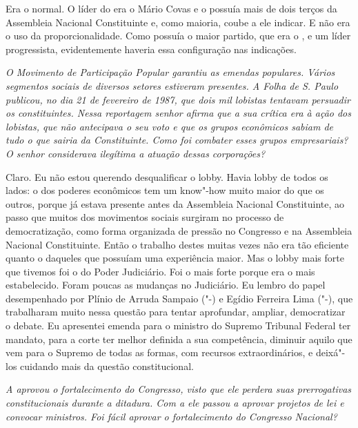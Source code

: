 Era o normal. O líder do  era o Mário Covas e o
 possuía mais de dois terços da Assembleia Nacional Constituinte e,
como maioria, coube a ele indicar. E não era o uso da proporcionalidade.
Como possuía o maior partido, que era o , e um líder progressista,
evidentemente haveria essa configuração nas indicações.

\medskip

\emph{O Movimento de Participação Popular garantiu as emendas
populares. Vários segmentos sociais de diversos setores estiveram
presentes. A Folha de S. Paulo publicou, no dia 21 de fevereiro de 1987,
que dois mil lobistas tentavam persuadir os constituintes. Nessa
reportagem senhor afirma que a sua crítica era à ação dos lobistas, que
não antecipava o seu voto e que os grupos econômicos sabiam de tudo o
que sairia da Constituinte. Como foi combater esses grupos empresariais?
O senhor considerava ilegítima a atuação dessas corporações?}

Claro. Eu não estou querendo desqualificar o lobby.
Havia lobby de todos os lados: o dos poderes econômicos tem um know"-how
muito maior do que os outros, porque já estava presente antes da
Assembleia Nacional Constituinte, ao passo que muitos dos movimentos
sociais surgiram no processo de democratização, como forma organizada de
pressão no Congresso e na Assembleia Nacional Constituinte. Então o
trabalho destes muitas vezes não era tão eficiente quanto o daqueles que
possuíam uma experiência maior. Mas o lobby mais forte que tivemos foi o
do Poder Judiciário. Foi o mais forte porque era o mais estabelecido.
Foram poucas as mudanças no Judiciário. Eu lembro do papel desempenhado
por Plínio de Arruda Sampaio ("-) e Egídio Ferreira Lima ("-),
que trabalharam muito nessa questão para tentar aprofundar, ampliar,
democratizar o debate. Eu apresentei emenda para o ministro do Supremo
Tribunal Federal ter mandato, para a corte ter melhor definida a sua
competência, diminuir aquilo que vem para o Supremo de todas as formas,
com recursos extraordinários, e deixá"-los cuidando mais da questão
constitucional.

\medskip

\emph{A  aprovou o fortalecimento do Congresso, visto que ele
perdera suas prerrogativas constitucionais durante a ditadura. Com a 
ele passou a aprovar projetos de lei e convocar ministros. Foi fácil
aprovar o fortalecimento do Congresso Nacional?}

